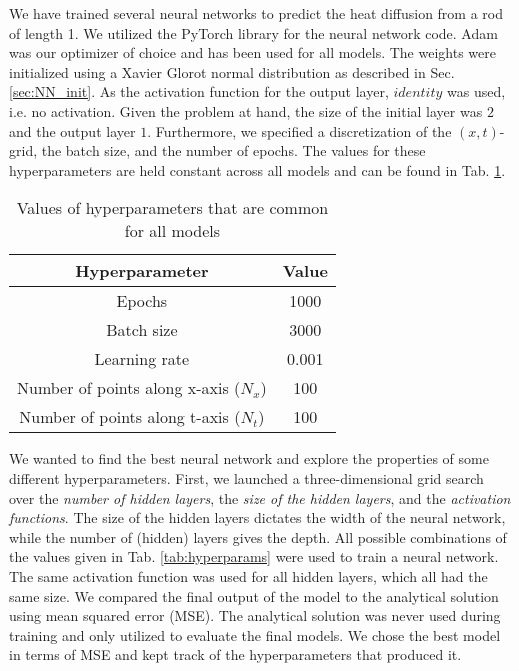 We have trained several neural networks to predict the heat diffusion from a rod of length 1.
We utilized the PyTorch library \cite{Ansel_PyTorch_2_Faster_2024} for the neural network code. 
Adam was our optimizer of choice and has been used for all models. 
The weights were initialized using a Xavier Glorot normal distribution as described in Sec. \ref{sec:NN_init}. 
As the activation function for the output layer, $identity$ was used, i.e. no activation. 
Given the problem at hand, the size of the initial layer was $2$ and the output layer $1$. 
Furthermore, we specified a discretization of the $(x,t)$-grid, the batch size, and the number of epochs. 
The values for these hyperparameters are held constant across all models and can be found in Tab. \ref{tab:valuesfornn}. 

\begin{table}[h!]
    \centering
    \begin{tabular}{|c|c|}
    \hline
        \textbf{Hyperparameter} & \textbf{Value}  \\ \hline
        Epochs & 1000  \\ \hline
        Batch size & 3000 \\\hline
        Learning rate & 0.001 \\ \hline
        Number of points along x-axis ($N_x$) & 100 \\ \hline
        Number of points along t-axis ($N_t$) & 100 \\ \hline
    \end{tabular}
    \caption{Values of hyperparameters that are common for all models}
    \label{tab:valuesfornn}
\end{table}



\mia{!!!!!}

We wanted to find the best neural network and explore the properties of some different hyperparameters. 
First, we launched a three-dimensional grid search over the \textit{number of hidden layers}, the \textit{size of the hidden layers}, and the \textit{activation functions}. 
The size of the hidden layers dictates the width of the neural network, while the number of (hidden) layers gives the depth. 
All possible combinations of the values given in Tab. \ref{tab:hyperparams} were used to train a neural network. 
The same activation function was used for all hidden layers, which all had the same size. 
We compared the final output of the model to the analytical solution using mean squared error (MSE). 
The analytical solution was never used during training and only utilized to evaluate the final models. 
We chose the best model in terms of MSE and kept track of the hyperparameters that produced it. 


